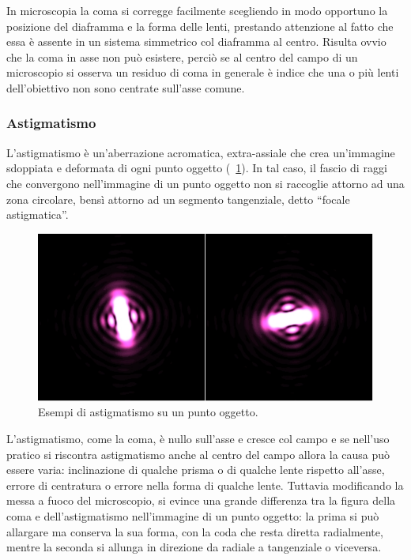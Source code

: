 In microscopia la coma si corregge facilmente scegliendo in modo opportuno la posizione del diaframma e la forma delle lenti, prestando attenzione al fatto che essa è assente in un sistema simmetrico col diaframma al centro.
Risulta ovvio che la coma in asse non può esistere, perciò se al centro del campo di un microscopio si osserva un residuo di coma in generale è indice che una o più lenti dell'obiettivo non sono centrate sull'asse comune.

\subsubsection{Astigmatismo}
L'astigmatismo è un'aberrazione acromatica, extra-assiale che crea un'immagine sdoppiata e deformata di ogni punto oggetto (\figurename~\ref{fig:astigmatismo}). In tal caso, il fascio di raggi che convergono nell'immagine di un punto oggetto non si raccoglie attorno ad una zona circolare, bensì attorno ad un segmento tangenziale, detto ``focale astigmatica''.

\begin{figure}
 \centering
 \includegraphics[scale=.50]{img/CAP2astig.jpg}
 \caption{\small{Esempi di astigmatismo su un punto oggetto.}}
 \label{fig:astigmatismo}
\end{figure}

L'astigmatismo, come la coma, è nullo sull'asse e cresce col campo e se nell'uso pratico si riscontra astigmatismo anche al centro del campo allora la causa può essere varia: inclinazione di qualche prisma o di qualche lente rispetto all'asse, errore di centratura o errore nella forma di qualche lente.
Tuttavia modificando la messa a fuoco del microscopio, si evince una grande differenza tra la figura della coma e dell'astigmatismo nell'immagine di un punto oggetto: la prima si può allargare ma conserva la sua forma, con la coda che resta diretta radialmente, mentre la seconda si allunga in direzione da radiale a tangenziale o viceversa. 

